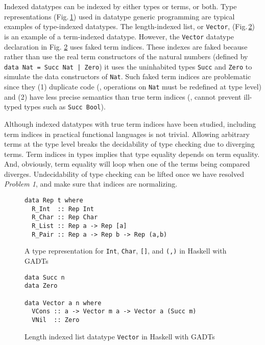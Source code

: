 Indexed datatypes can be indexed by either types or terms, or both.
Type representations \cite{CheHin03} (Fig.\,\ref{fig:rep}) used in
datatype generic programming are typical examples of type-indexed datatypes.
The length-indexed list, or \texttt{Vector}, (Fig.\,\ref{fig:vec})
is an example of a term-indexed datatype.
However, the \texttt{Vector} datatype declaration in Fig.\; \ref{fig:vec}
uses faked term indices. These indexes are faked because
rather than use the real term constructors of the natural numbers
(defined by \verb/data Nat = Succ Nat | Zero/)
it uses the uninhabited types \verb|Succ| and \verb|Zero|
to simulate the data constructors of \verb+Nat+. Such faked term indices are 
problematic since
they (1) duplicate code (\ie, operations on \texttt{Nat} must be redefined
at type level) and (2) have less precise semantics than true term indices
(\eg, cannot prevent ill-typed types such as \texttt{Succ Bool}).

Although indexed datatypes with true term indices have been studied\cite{Zenger97},
including term indices in practical functional languages
is not trivial. Allowing arbitrary terms at the type level breaks the decidability
of type checking due to diverging terms. Term indices in types implies that
type equality depends on term equality. And, obviously, term equality will loop
when one of the terms being compared diverges. Undecidability of type checking
can be lifted once we have resolved \textit{Problem 1}, and make sure that
indices are normalizing.

\begin{figure}
\begin{verbatim}
data Rep t where
  R_Int  :: Rep Int
  R_Char :: Rep Char
  R_List :: Rep a -> Rep [a]
  R_Pair :: Rep a -> Rep b -> Rep (a,b)
\end{verbatim}
\caption{A type representation for \texttt{Int}, \texttt{Char},
	\texttt{[]}, and \texttt{(,)} in Haskell with GADTs}
\label{fig:rep}
\end{figure}

\begin{figure}
\begin{verbatim}
data Succ n
data Zero

data Vector a n where
  VCons :: a -> Vector m a -> Vector a (Succ m)
  VNil  :: Zero
\end{verbatim}
\caption{Length indexed list datatype \texttt{Vector}
	in Haskell with GADTs}
\label{fig:vec}
\end{figure}



